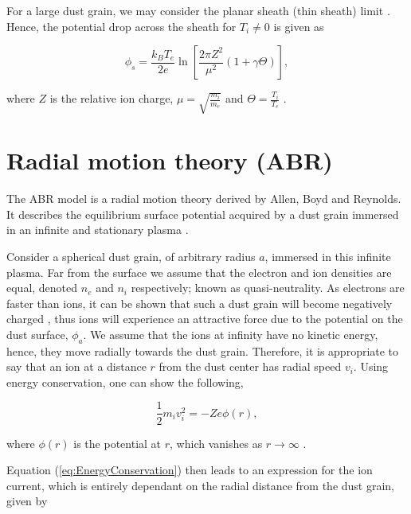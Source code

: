 \documentclass{article}
\begin{document}
\medskip

For a large dust grain, we may consider the planar sheath (thin sheath) limit \cite{Willis}. 
Hence, the potential drop across the sheath for $T_i \neq 0$ is given as

\begin{equation}\label{eq:SheathDrop}
\phi_s = \frac{k_B T_e}{2e}\ln{\left[\frac{2\pi Z^2}{\mu^2}(1 + \gamma \Theta)\right]},
\end{equation}

\noindent where $Z$ is the relative ion charge, $\mu = \sqrt{\frac{m_i}{m_e}}$ and $\Theta = \frac{T_i}{T_e}$ \cite{Stangeby1986}.

\newpage

\section{Radial motion theory (ABR)}

\smallskip

The ABR model is a radial motion theory derived by Allen, Boyd and Reynolds. It describes the equilibrium surface potential acquired
by a dust grain immersed in an infinite and stationary plasma \cite{ABR}.

\medskip

Consider a spherical dust grain, of arbitrary radius $a$, immersed in this infinite plasma. Far from the surface we assume that the electron
and ion densities are equal, denoted $n_e$ and $n_i$ respectively; known as quasi-neutrality. As electrons are faster than ions, it can be shown that such a dust grain will become negatively 
charged \cite{Thomas}, thus ions will experience an attractive force due to the potential on the dust surface, 
$\phi_a$. We assume that the ions at infinity have no kinetic energy, hence, they move radially
towards the dust grain. Therefore, it is appropriate to say that an ion at a distance 
$r$ from the dust center has radial speed $v_i$. Using energy conservation, one can show the following,

\begin{equation}\label{eq:EnergyConservation}
\frac{1}{2} m_i v_i^2 = -Ze\phi(r),
\end{equation}

\noindent where $\phi(r)$ is the potential at $r$, which vanishes as $r \to \infty$ \cite{ABR}.

\medskip

Equation (\ref{eq:EnergyConservation}) then leads to an expression for the ion current, which is entirely dependant on the radial distance from the 
dust grain, given by
\end{document}
